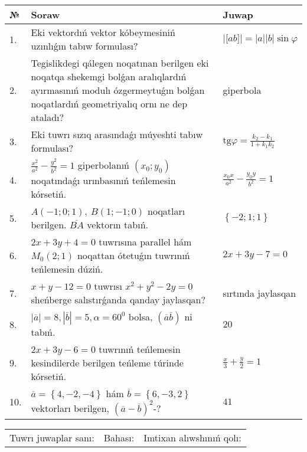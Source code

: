\documentclass{article}
\begin{document}
\begin{tabular}{|m{0.7cm}|m{10cm}|m{4cm}|}
\hline
№ & Soraw & Juwap \\
\hline
1. & Eki vektordıń vektor kóbeymesiniń uzınlıǵın tabıw formulası? & $\left| \lbrack ab\rbrack \right|=|a||b|\sin\varphi$ \\
\hline
2. & Tegislikdegi qálegen noqatınan berilgen eki noqatqa shekemgi bolǵan aralıqlardıń ayırmasınıń modulı ózgermeytuǵın bolǵan noqatlardıń geometriyalıq ornı ne dep ataladı? & giperbola \\
\hline
3. & Eki tuwrı sızıq arasındaǵı múyeshti tabıw formulası? & $\text{tg}\varphi=\frac{k_2-k_1}{1+k_1k_2}$ \\
\hline
4. & $\frac{x^2}{a^2}-\frac{y^2}{b^2}=1$ giperbolanıń $(x_0;y_0)$ noqatındaǵı urınbasınıń teńlemesin kórsetiń. & $\frac{x_0x}{a^2}-\frac{y_0y}{b^2}=1$ \\
\hline
5. & $A (-1;0;1),\ B (1;-1;0)$ noqatları berilgen. $\overline{BA}$ vektorın tabıń. & $\left\{ - 2;1;1 \right\}$ \\
\hline
6. & $2x+3y+4=0$ tuwrısına parallel hám $M_{0} (2;1)$ noqattan ótetuǵın tuwrınıń teńlemesin dúziń. & $2x+3y-7=0$ \\
\hline
7. & $x+y-12=0$ tuwrısı $x^{2}+y^{2}-2y=0$ sheńberge salıstırǵanda qanday jaylasqan? & sırtında jaylasqan \\
\hline
8. & $\left| \overline{a} \right|=8, \left| \overline{b} \right|=5, \alpha=60^{0}$ bolsa, $( \overline{a}\overline{b} )$ ni tabıń. & $20$ \\
\hline
9. & $2x+3y-6=0$ tuwrınıń teńlemesin kesindilerde berilgen teńleme túrinde kórsetiń. & $\frac{x}{3} + \frac{ y }{ 2 } =  1$ \\
\hline
10. & $\overline{a}=\left\{ 4,-2,-4 \right\}$ hám $\overline{b}=\left\{ 6,-3, 2 \right\}$ vektorları berilgen, $(\overline{a}-\overline{b}) ^{2}$-? & $41$ \\
\hline
\end{tabular}

\vspace{1cm}

\begin{tabular}{lll}
Tuwrı juwaplar sanı: \underline{\hspace{1.5cm}} & 
Bahası: \underline{\hspace{1.5cm}} & 
Imtixan alıwshınıń qolı: \underline{\hspace{2cm}} \\
\end{tabular}
\end{document}
